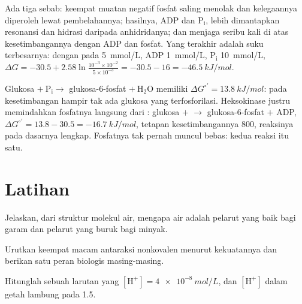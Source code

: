 \begin{example}\label{ex:b1:water-small-molecules:whyatp}
Ada tiga sebab: keempat muatan negatif fosfat  saling menolak dan
kelegaannya diperoleh lewat pembelahannya; hasilnya, $\mathrm{ADP}$ dan
$\mathrm{P_i}$, lebih dimantapkan resonansi dan hidrasi daripada
anhidridanya; dan  menjaga  seribu kali di atas kesetimbangannya
dengan ADP dan fosfat. Yang terakhir adalah suku terbesarnya: dengan
 pada \qty{5}{mmol/L}, ADP \qty{1}{mmol/L}, $\mathrm{P_i}$
\qty{10}{mmol/L},
$\Delta G = -30.5 + 2.58\ln\frac{10^{-3}\times 10^{-2}}{5\times 10^{-3}}
= -30.5 - 16 = \qty{-46.5}{kJ/mol}$.
\end{example}

\begin{example}[Penggandengan]\label{ex:b1:water-small-molecules:coupling}
Glukosa $+\ \mathrm{P_i} \to$ glukosa-6-fosfat $+\ \mathrm{H_2O}$
memiliki $\Delta G^{\circ\prime} = \qty{+13.8}{kJ/mol}$: pada
kesetimbangan hampir tak ada glukosa yang terfosforilasi. Heksokinase
justru memindahkan fosfatnya langsung dari : glukosa $+$  $\to$
glukosa-6-fosfat $+$ ADP, $\Delta G^{\circ\prime} = 13.8 - 30.5 =
\qty{-16.7}{kJ/mol}$, tetapan kesetimbangannya $800$, reaksinya pada
dasarnya lengkap. Fosfatnya tak pernah muncul bebas: kedua reaksi itu
satu.
\end{example}

\section{Latihan}

\begin{exercise}[$\star$]\label{exo:b1:water-small-molecules:1}
Jelaskan, dari struktur molekul air, mengapa air adalah pelarut yang
baik bagi garam dan pelarut yang buruk bagi minyak.
\end{exercise}

\begin{exercise}[$\star$]\label{exo:b1:water-small-molecules:2}
Urutkan keempat macam antaraksi nonkovalen menurut kekuatannya dan
berikan satu peran biologis masing-masing.
\end{exercise}

\begin{exercise}[$\star$]\label{exo:b1:water-small-molecules:3}
Hitunglah  sebuah larutan yang $[\mathrm{H^+}] = \qty{4e-8}{mol/L}$,
dan $[\mathrm{H^+}]$ dalam getah lambung pada  1.5.
\end{exercise}

